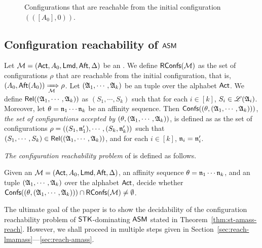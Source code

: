 \begin{example}
\begin{figure}[htbp]
			\caption{Configurations that are reachable from the initial configuration $(([A_0], 0))$.} %
			\label{stk-asm-example}
\end{figure}
\end{example}



\subsection{Configuration reachability of $\textsf{ASM}$} \label{sec-conf-reach}

Let ${\mathcal{M} } =({\sf Act}, A_0, {\sf Lmd}, {\sf Aft}, \Delta)$ be an  {\AMASS}. We define $\mathsf{RConfs}({\mathcal{M} })$ as the set of configurations $\rho$ that are reachable from the initial configuration, that is, 
$(A_0, {\sf Aft}(A_0)) \xRightarrow[{\mathcal{M} }]{} \rho$. 
Let $({\mathfrak{A} }_1,\cdots,{\mathfrak{A} }_k)$ be an {\NFA} tuple over the alphabet ${\sf Act}$. We define $\mathsf{Rel}(({\mathfrak{A} }_1, \cdots, {\mathfrak{A} }_k))$ as $(S_1, \cdots, S_k)$ such that for each $i \in [k]$, $S_i \in {\mathscr{L} }({\mathfrak{A} }_i)$. Moreover, let $\theta = \mathfrak{n}_1\cdots\mathfrak{n}_k$ be an affinity sequence. Then ${\mathsf{Confs} }((\theta, ({\mathfrak{A} }_1,\cdots,{\mathfrak{A} }_k)))$, \emph{the set of configurations accepted by $(\theta, ({\mathfrak{A} }_1,\cdots,{\mathfrak{A} }_k))$}, is defined as as the set of configurations $\rho = ((S_1,\mathfrak{n}'_1),\cdots,(S_k,\mathfrak{n}'_k))$  such that $(S_1, \cdots, S_k) \in \mathsf{Rel}(({\mathfrak{A} }_1, \cdots, {\mathfrak{A} }_k))$, and for each $i \in [k]$, $\mathfrak{n}_i=\mathfrak{n}_i'$.
%

\emph{The configuration reachability problem} of {\AMASS} is defined as follows. 
\smallskip

\fbox
{
	\begin{minipage}{0.9\textwidth} 
 	Given an {\AMASS} ${\mathcal{M} }= ({\sf Act}, A_0, {\sf Lmd}, {\sf Aft}, \Delta)$, an affinity sequence $\theta = \mathfrak{n}_1\cdots\mathfrak{n}_k$, and an {\NFA} tuple $({\mathfrak{A} }_1,\cdots,{\mathfrak{A} }_k)$ over the alphabet ${\sf Act}$, decide whether $ {\mathsf{Confs} }({(\theta, ({\mathfrak{A} }_1,\cdots,{\mathfrak{A} }_k))}) \cap \mathsf{RConfs}({\mathcal{M} }) \neq \emptyset$.
 \end{minipage}
}
\smallskip

The ultimate goal of the paper is to show the decidability of the configuration reachability problem of $\mathsf{STK}$-dominating $\textsf{ASM}$  stated in Theorem~\ref{thm:st-amass-reach}. However, we shall proceed in multiple steps given in Section~\ref{sec:reach-lmamass}---\ref{sec:reach-amass}.

